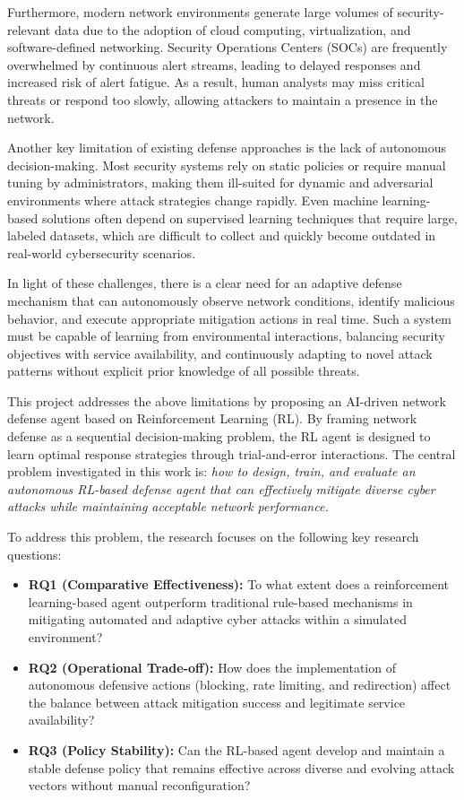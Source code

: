 \documentclass[12pt,a4paper]{report}
\begin{document}
Furthermore, modern network environments generate large volumes of security-relevant data due to the adoption of cloud computing, virtualization, and software-defined networking. Security Operations Centers (SOCs) are frequently overwhelmed by continuous alert streams, leading to delayed responses and increased risk of alert fatigue. As a result, human analysts may miss critical threats or respond too slowly, allowing attackers to maintain a presence in the network.

Another key limitation of existing defense approaches is the lack of autonomous decision-making. Most security systems rely on static policies or require manual tuning by administrators, making them ill-suited for dynamic and adversarial environments where attack strategies change rapidly. Even machine learning-based solutions often depend on supervised learning techniques that require large, labeled datasets, which are difficult to collect and quickly become outdated in real-world cybersecurity scenarios.

In light of these challenges, there is a clear need for an adaptive defense mechanism that can autonomously observe network conditions, identify malicious behavior, and execute appropriate mitigation actions in real time. Such a system must be capable of learning from environmental interactions, balancing security objectives with service availability, and continuously adapting to novel attack patterns without explicit prior knowledge of all possible threats.

This project addresses the above limitations by proposing an AI-driven network defense agent based on Reinforcement Learning (RL). By framing network defense as a sequential decision-making problem, the RL agent is designed to learn optimal response strategies through trial-and-error interactions. The central problem investigated in this work is: \textit{how to design, train, and evaluate an autonomous RL-based defense agent that can effectively mitigate diverse cyber attacks while maintaining acceptable network performance.}

To address this problem, the research focuses on the following key research questions:

\begin{itemize}
  \item \textbf{RQ1 (Comparative Effectiveness):} To what extent does a reinforcement learning-based agent outperform traditional rule-based mechanisms in mitigating automated and adaptive cyber attacks within a simulated environment?
  \item \textbf{RQ2 (Operational Trade-off):} How does the implementation of autonomous defensive actions (blocking, rate limiting, and redirection) affect the balance between attack mitigation success and legitimate service availability?
  \item \textbf{RQ3 (Policy Stability):} Can the RL-based agent develop and maintain a stable defense policy that remains effective across diverse and evolving attack vectors without manual reconfiguration?
\end{itemize}
\end{document}
